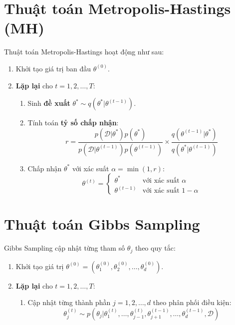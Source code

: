 \section{Thuật toán Metropolis-Hastings (MH)}
Thuật toán Metropolis-Hastings hoạt động như sau:
\begin{enumerate}
    \item Khởi tạo giá trị ban đầu $\theta^{(0)}$.
    \item \textbf{Lặp lại} cho $t = 1, 2, \dots, T$:
    \begin{enumerate}
        \item Sinh \textbf{đề xuất} $\theta^* \sim q(\theta^* | \theta^{(t-1)})$.
        \item Tính toán \textbf{tỷ số chấp nhận}:
        \begin{equation}
            r = \frac{p(\mathcal{D} | \theta^*) p(\theta^*)}{p(\mathcal{D} | \theta^{(t-1)}) p(\theta^{(t-1)})} \times \frac{q(\theta^{(t-1)} | \theta^*)}{q(\theta^* | \theta^{(t-1)})}
        \end{equation}
        \item Chấp nhận $\theta^*$ với xác suất $\alpha = \min(1, r)$:
        \begin{equation}
            \theta^{(t)} =
            \begin{cases}
                \theta^*  & \text{với xác suất } \alpha  \\
                \theta^{(t-1)} & \text{với xác suất } 1 - \alpha
            \end{cases}
        \end{equation}
    \end{enumerate}
\end{enumerate}

\section{Thuật toán Gibbs Sampling}
Gibbs Sampling cập nhật từng tham số $\theta_j$ theo quy tắc:
\begin{enumerate}
    \item Khởi tạo giá trị $\theta^{(0)} = (\theta_1^{(0)}, \theta_2^{(0)}, \dots, \theta_d^{(0)})$.
    \item \textbf{Lặp lại} cho $t = 1, 2, \dots, T$:
    \begin{enumerate}
        \item Cập nhật từng thành phần $j = 1, 2, \dots, d$ theo phân phối điều kiện:
        \begin{equation}
            \theta_j^{(t)} \sim p(\theta_j | \theta_1^{(t)}, \dots, \theta_{j-1}^{(t)}, \theta_{j+1}^{(t-1)}, \dots, \theta_d^{(t-1)}, \mathcal{D})
        \end{equation}
    \end{enumerate}
\end{enumerate}

